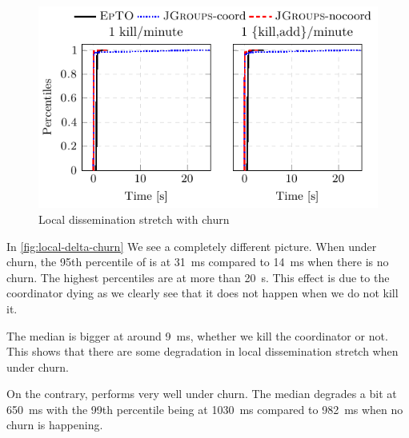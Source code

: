  \begin{figure}[hpt]
 	\centering
 	\includegraphics[width=\linewidth]{figures/local-diss-stretch-synth-churn.pdf}
 	\vspace{-2mm} 
 	\caption{Local dissemination stretch with churn}
 	\vspace{-2mm}
 	\label{fig:local-delta-churn}   
 \end{figure}
In \autoref{fig:local-delta-churn} We see a completely different picture. When under churn, the 95th percentile of \jgroups is at \SI{31}{\milli\second} compared to \SI{14}{\milli\second} when there is no churn. The highest percentiles are at more than \SI{20}{\second}. This effect is due to the coordinator dying as we clearly see that it does not happen when we do not kill it.

The median is bigger at around \SI{9}{\milli\second}, whether we kill the coordinator or not. This shows that there are some degradation in \jgroups local dissemination stretch when under churn.

On the contrary, \epto performs very well under churn. The median degrades a bit at \SI{650}{\milli\second} with the 99th percentile being at \SI{1030}{\milli\second} compared to \SI{982}{\milli\second} when no churn is happening.
